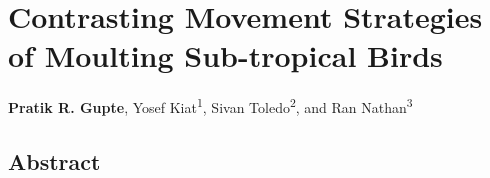 \chapter{Contrasting Movement Strategies of Moulting Sub-tropical Birds}\label{ch:holeybirds}

\noindent \textbf{Pratik R. Gupte}, Yosef Kiat\textsuperscript{1}, Sivan Toledo\textsuperscript{2}, and Ran Nathan\textsuperscript{3}


\section*{Abstract}

\footnotesize{
    
    \medskip

}

\clearpage

